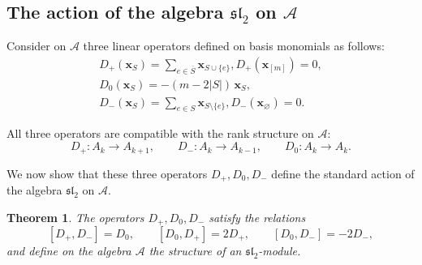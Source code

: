\documentclass[12pt,reqno]{amsart}
\newtheorem{theorem}{Theorem}[section]
\begin{document}
\subsection{The action of the algebra $\mathfrak{sl}_2$ on $\mathcal {A}$}

Consider on $\mathcal {A}$ three linear operators defined on basis monomials as follows:
\begin{gather*}
D_+(\boldsymbol{x}_S)=\sum_{e\in\overline S}\boldsymbol{x}_{S\cup\{e\}}, D_+(\boldsymbol{x}_{[m]})=0,\\
D_0(\boldsymbol{x}_S)=-(m-2|S|)\,\boldsymbol{x}_S,\\
D_-(\boldsymbol{x}_S)=\sum_{e\in S}\boldsymbol{x}_{S\setminus\{e\}},D_-(\boldsymbol{x}_\varnothing)=0.
\end{gather*}

All three operators are compatible with the rank structure on $\mathcal A:$
$$
D_+:A_k\to A_{k+1},\qquad
D_-:A_k\to A_{k-1},\qquad
D_0:A_k\to A_k.
$$

We now show that these three operators $D_+,D_0,D_-$ define the standard
action of the algebra $\mathfrak{sl}_2$ on $\mathcal A$.
\begin{theorem}
The operators $D_+,D_0,D_-$ satisfy the relations
\begin{equation}\label{sl2_on_A_relations}
[D_+,D_-]=D_0,\qquad
[D_0,D_+]=2D_+,\qquad
[D_0,D_-]=-2D_-,
\end{equation}
and define on the algebra $\mathcal A$ the structure of an
$\mathfrak{sl}_2$-module.
\end{theorem}
\end{document}
